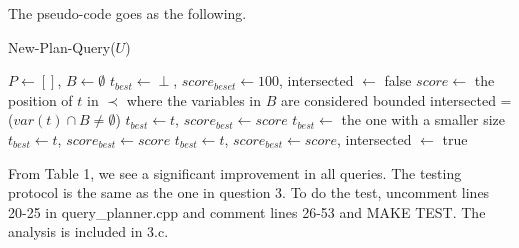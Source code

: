 \documentclass{article}
\begin{document}
\begin{enumerate}
\begin{enumerate}
The pseudo-code goes as the following. 

\begin{algorithm}[H]
\caption{New-Plan-Query($U$)}\label{alg:greedy}
\begin{algorithmic}

\State $P \leftarrow []$, $B\leftarrow \emptyset$
\State $t_{best}\leftarrow \perp$, $score_{beset} \leftarrow 100$, intersected $\leftarrow$ false
\State $score \leftarrow$ the position of $t$ in $\prec$ where the variables in $B$ are considered bounded
\State intersected = ($var(t) \cap B \neq \emptyset$)
\State $t_{best} \leftarrow t$, $score_{best} \leftarrow score$
\EndIf
{}
\State $t_{best}\leftarrow$ the one with a smaller size
\EndIf
{}
\State $t_{best} \leftarrow t$, $score_{best} \leftarrow score$
\EndIf
\Else
{} 
\State $t_{best} \leftarrow t$, $score_{best} \leftarrow score$, intersected $\leftarrow$ true
\EndIf
\EndIf

\EndFor
\EndWhile

\end{algorithmic}
\end{algorithm}


From Table 1, we see a significant improvement in all queries. The testing protocol is the same as the one in question 3. To do the test, uncomment lines 20-25 in query\_planner.cpp and comment lines 26-53 and MAKE TEST. The analysis is included in 3.c.


\end{enumerate}
\end{enumerate}
\end{document}
